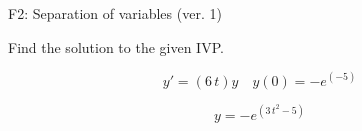 \begin{exercise}
  \begin{exerciseTitle}F2: Separation of variables (ver. 1)\end{exerciseTitle}
  \begin{exerciseStatement}
    
Find the solution to the given IVP.

    
\[y'=( 6 \, t )y\hspace{1em} y(0)= -e^{\left(-5\right)}\]

  \end{exerciseStatement}
  \begin{exerciseAnswer}
    
\[y= -e^{\left(3 \, t^{2} - 5\right)}\]

  \end{exerciseAnswer}
\end{exercise}
